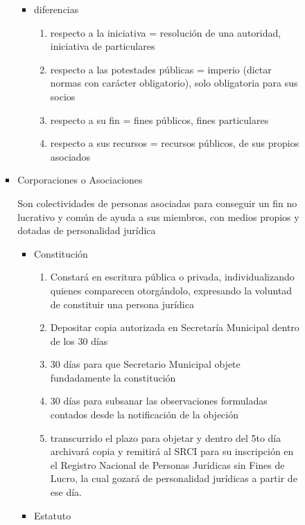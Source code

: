 \documentclass[]{article}
\providecommand{\tightlist}{%
  \setlength{\itemsep}{0pt}\setlength{\parskip}{0pt}}
\begin{document}
\begin{itemize}
\begin{itemize}
\begin{itemize}
\begin{itemize}
        \begin{itemize}
        \tightlist
        \item
          diferencias

          \begin{enumerate}
          \def\labelenumi{\arabic{enumi}.}
          \tightlist
          \item
            respecto a la iniciativa = resolución de una autoridad,
            iniciativa de particulares
          \item
            respecto a las potestades públicas = imperio (dictar normas
            con carácter obligatorio), solo obligatoria para sus socios
          \item
            respecto a su fin = fines públicos, fines particulares
          \item
            respecto a sus recursos = recursos públicos, de sus propios
            asociados
          \end{enumerate}
        \end{itemize}
      \item
        Corporaciones o Asociaciones

        Son colectividades de personas asociadas para conseguir un fin
        no lucrativo y común de ayuda a sus miembros, con medios propios
        y dotadas de personalidad jurídica

        \begin{itemize}
        \item
          Constitución

          \begin{enumerate}
          \def\labelenumi{\arabic{enumi}.}
          \tightlist
          \item
            Constará en escritura pública o privada, individualizando
            quienes comparecen otorgándolo, expresando la voluntad de
            constituir una persona jurídica
          \item
            Depositar copia autorizada en Secretaría Municipal dentro de
            los 30 días
          \item
            30 días para que Secretario Municipal objete fundadamente la
            constitución
          \item
            30 días para subsanar las observaciones formuladas contados
            desde la notificación de la objeción
          \item
            transcurrido el plazo para objetar y dentro del 5to día
            archivará copia y remitirá al SRCI para su inscripción en el
            Registro Nacional de Personas Jurídicas sin Fines de Lucro,
            la cual gozará de personalidad jurídicas a partir de ese
            día.
          \end{enumerate}
        \item
          Estatuto


\end{itemize}
\end{itemize}
\end{itemize}
\end{itemize}
\end{itemize}
\end{document}
